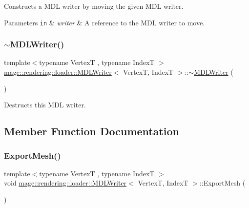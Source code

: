 Constructs a M\+DL writer by moving the given M\+DL writer.


\begin{DoxyParams}[1]{Parameters}
\mbox{\tt in}  & {\em writer} & A reference to the M\+DL writer to move. \\
\hline
\end{DoxyParams}
\mbox{\label{classmage_1_1rendering_1_1loader_1_1_m_d_l_writer_aaa0fb8c60dee5352ed467bfb3f283f43}} 
\subsubsection{\texorpdfstring{$\sim$\+M\+D\+L\+Writer()}{~MDLWriter()}}
{\footnotesize\ttfamily template$<$typename VertexT , typename IndexT $>$ \\
\mbox{\hyperlink{classmage_1_1rendering_1_1loader_1_1_m_d_l_writer}{mage\+::rendering\+::loader\+::\+M\+D\+L\+Writer}}$<$ VertexT, IndexT $>$\+::$\sim$\mbox{\hyperlink{classmage_1_1rendering_1_1loader_1_1_m_d_l_writer}{M\+D\+L\+Writer}} (\begin{DoxyParamCaption}{ }\end{DoxyParamCaption})}

Destructs this M\+DL writer. 

\subsection{Member Function Documentation}
\mbox{\label{classmage_1_1rendering_1_1loader_1_1_m_d_l_writer_a77189702168fc4ea6b9482a9efec788f}} 
\subsubsection{\texorpdfstring{Export\+Mesh()}{ExportMesh()}}
{\footnotesize\ttfamily template$<$typename VertexT , typename IndexT $>$ \\
void \mbox{\hyperlink{classmage_1_1rendering_1_1loader_1_1_m_d_l_writer}{mage\+::rendering\+::loader\+::\+M\+D\+L\+Writer}}$<$ VertexT, IndexT $>$\+::Export\+Mesh (\begin{DoxyParamCaption}{ }\end{DoxyParamCaption})\hspace{0.3cm}{\ttfamily [private]}}

